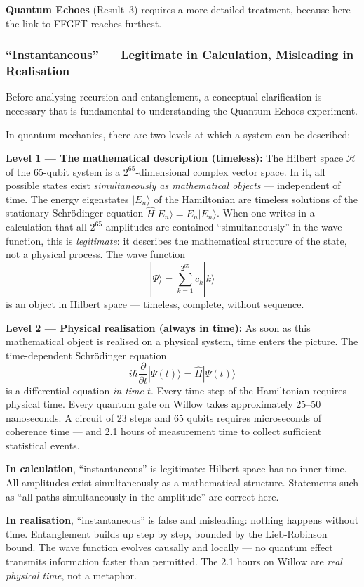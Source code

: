 \textbf{Quantum Echoes} (Result~3) requires a more detailed treatment,
because here the link to FFGFT reaches furthest.

\subsubsection*{``Instantaneous'' — Legitimate in Calculation, Misleading in Realisation}

Before analysing recursion and entanglement, a conceptual clarification is necessary
that is fundamental to understanding the Quantum Echoes experiment.

In quantum mechanics, there are two levels at which a system can be described:

\textbf{Level 1 — The mathematical description (timeless):}
The Hilbert space $\mathcal{H}$ of the 65-qubit system is a $2^{65}$-dimensional
complex vector space. In it, all possible states exist \emph{simultaneously as
mathematical objects} — independent of time. The energy eigenstates $|E_n\rangle$
of the Hamiltonian are timeless solutions of the stationary Schrödinger equation
$\hat{H}|E_n\rangle = E_n|E_n\rangle$.
When one writes in a calculation that all $2^{65}$ amplitudes are contained
``simultaneously'' in the wave function, this is \emph{legitimate}: it describes
the mathematical structure of the state, not a physical process. The wave function
\begin{equation}
    |\Psi\rangle = \sum_{k=1}^{2^{65}} c_k |k\rangle
\end{equation}
is an object in Hilbert space — timeless, complete, without sequence.

\textbf{Level 2 — Physical realisation (always in time):}
As soon as this mathematical object is realised on a physical system, time enters
the picture. The time-dependent Schrödinger equation
\begin{equation}
    i\hbar \frac{\partial}{\partial t}|\Psi(t)\rangle = \hat{H}|\Psi(t)\rangle
\end{equation}
is a differential equation \emph{in time $t$}. Every time step of the Hamiltonian
requires physical time. Every quantum gate on Willow takes approximately 25--50
nanoseconds. A circuit of 23 steps and 65 qubits requires microseconds of coherence
time — and 2.1 hours of measurement time to collect sufficient statistical events.

\begin{important}
\textbf{In calculation}, ``instantaneous'' is legitimate: Hilbert space has no
inner time. All amplitudes exist simultaneously as a mathematical structure.
Statements such as ``all paths simultaneously in the amplitude'' are correct here.

\textbf{In realisation}, ``instantaneous'' is false and misleading: nothing happens
without time. Entanglement builds up step by step, bounded by the Lieb-Robinson
bound. The wave function evolves causally and locally — no quantum effect transmits
information faster than permitted. The 2.1 hours on Willow are \emph{real physical
time}, not a metaphor.
\end{important}

